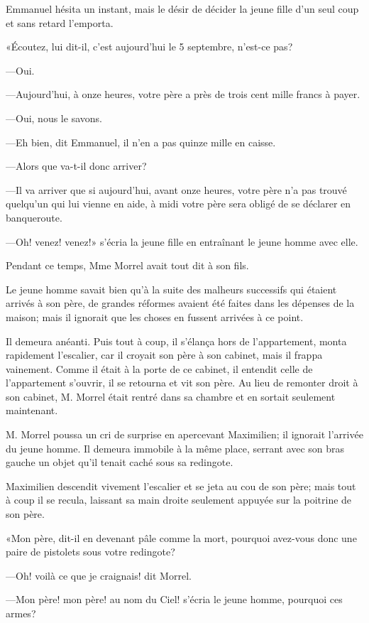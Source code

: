 Emmanuel hésita un instant, mais le désir de décider la jeune fille d'un seul coup et sans retard l'emporta.

«Écoutez, lui dit-il, c'est aujourd'hui le 5 septembre, n'est-ce pas?

—Oui.

—Aujourd'hui, à onze heures, votre père a près de trois cent mille francs à payer.

—Oui, nous le savons.

—Eh bien, dit Emmanuel, il n'en a pas quinze mille en caisse.

—Alors que va-t-il donc arriver?

—Il va arriver que si aujourd'hui, avant onze heures, votre père n'a pas trouvé quelqu'un qui lui vienne en aide, à midi votre père sera obligé de se déclarer en banqueroute.

—Oh! venez! venez!» s'écria la jeune fille en entraînant le jeune homme avec elle.

Pendant ce temps, Mme Morrel avait tout dit à son fils.

Le jeune homme savait bien qu'à la suite des malheurs successifs qui étaient arrivés à son père, de grandes réformes avaient été faites dans les dépenses de la maison; mais il ignorait que les choses en fussent arrivées à ce point.

Il demeura anéanti. Puis tout à coup, il s'élança hors de l'appartement, monta rapidement l'escalier, car il croyait son père à son cabinet, mais il frappa vainement. Comme il était à la porte de ce cabinet, il entendit celle de l'appartement s'ouvrir, il se retourna et vit son père. Au lieu de remonter droit à son cabinet, M. Morrel était rentré dans sa chambre et en sortait seulement maintenant.

M. Morrel poussa un cri de surprise en apercevant Maximilien; il ignorait l'arrivée du jeune homme. Il demeura immobile à la même place, serrant avec son bras gauche un objet qu'il tenait caché sous sa redingote.

Maximilien descendit vivement l'escalier et se jeta au cou de son père; mais tout à coup il se recula, laissant sa main droite seulement appuyée sur la poitrine de son père.

«Mon père, dit-il en devenant pâle comme la mort, pourquoi avez-vous donc une paire de pistolets sous votre redingote?

—Oh! voilà ce que je craignais! dit Morrel.

—Mon père! mon père! au nom du Ciel! s'écria le jeune homme, pourquoi ces armes?

